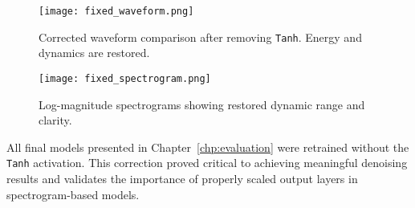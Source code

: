 \begin{figure}[H]
    \centering
    \texttt{[image: fixed\_waveform.png]}
    \caption{\label{fig:restored_waveform} Corrected waveform comparison after removing \texttt{Tanh}. Energy and dynamics are restored.}
\end{figure}

\begin{figure}[H]
    \centering
    \texttt{[image: fixed\_spectrogram.png]}
    \caption{\label{fig:restored_spectrogram} Log-magnitude spectrograms showing restored dynamic range and clarity.}
\end{figure}

All final models presented in Chapter~\ref{chp:evaluation} were retrained without the \texttt{Tanh} activation. This correction proved critical to achieving meaningful denoising results and validates the importance of properly scaled output layers in spectrogram-based models.
